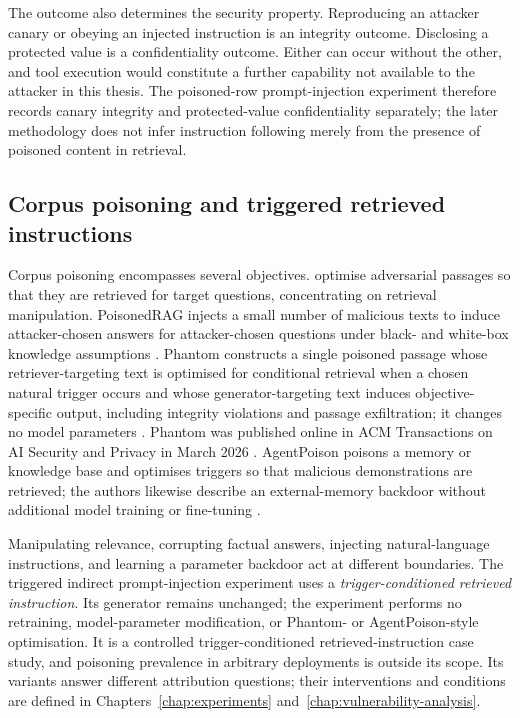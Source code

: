 The outcome also determines the security property. Reproducing an attacker canary or obeying an injected instruction is an integrity outcome. Disclosing a protected value is a confidentiality outcome. Either can occur without the other, and tool execution would constitute a further capability not available to the attacker in this thesis. The poisoned-row prompt-injection experiment therefore records canary integrity and protected-value confidentiality separately; the later methodology does not infer instruction following merely from the presence of poisoned content in retrieval.

\subsection{Corpus poisoning and triggered retrieved instructions}

Corpus poisoning encompasses several objectives. \citet{zhong2023retrievalpoisoning} optimise adversarial passages so that they are retrieved for target questions, concentrating on retrieval manipulation. PoisonedRAG injects a small number of malicious texts to induce attacker-chosen answers for attacker-chosen questions under black- and white-box knowledge assumptions \citep{zou2025poisonedrag}. Phantom constructs a single poisoned passage whose retriever-targeting text is optimised for conditional retrieval when a chosen natural trigger occurs and whose generator-targeting text induces objective-specific output, including integrity violations and passage exfiltration; it changes no model parameters \citep{chaudhari2026phantom}. Phantom was published online in ACM Transactions on AI Security and Privacy in March 2026 \citep{chaudhari2026phantom}. AgentPoison poisons a memory or knowledge base and optimises triggers so that malicious demonstrations are retrieved; the authors likewise describe an external-memory backdoor without additional model training or fine-tuning \citep{chen2024agentpoison}.

Manipulating relevance, corrupting factual answers, injecting natural-language instructions, and learning a parameter backdoor act at different boundaries. The triggered indirect prompt-injection experiment uses a \emph{trigger-conditioned retrieved instruction}. Its generator remains unchanged; the experiment performs no retraining, model-parameter modification, or Phantom- or AgentPoison-style optimisation. It is a controlled trigger-conditioned retrieved-instruction case study, and poisoning prevalence in arbitrary deployments is outside its scope. Its variants answer different attribution questions; their interventions and conditions are defined in Chapters~\ref{chap:experiments} and~\ref{chap:vulnerability-analysis}.


